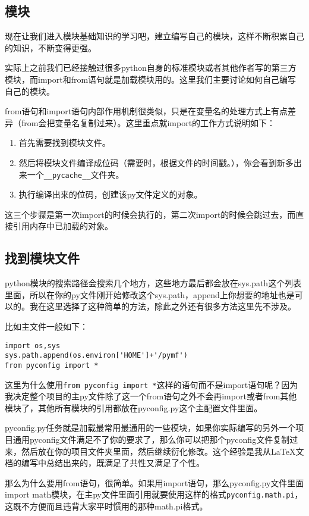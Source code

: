 \documentclass[12pt,oneside]{book}
\begin{document}
\begin{common-format}
\chapter{模块}
现在让我们进入模块基础知识的学习吧，建立编写自己的模块，这样不断积累自己的知识，不断变得更强。

实际上之前我们已经接触过很多python自身的标准模块或者其他作者写的第三方模块，而import和from语句就是加载模块用的。这里我们主要讨论如何自己编写自己的模块。

from语句和import语句内部作用机制很类似，只是在变量名的处理方式上有点差异（from会把变量名复制过来）。这里重点就import的工作方式说明如下：
\begin{enumerate}
\item 首先需要找到模块文件。
\item 然后将模块文件编译成位码（需要时，根据文件的时间戳。），你会看到新多出来一个\verb+__pycache__+文件夹。
\item 执行编译出来的位码，创建该py文件定义的对象。
\end{enumerate}
这三个步骤是第一次import的时候会执行的，第二次import的时候会跳过去，而直接引用内存中已加载的对象。



\section{找到模块文件}
python模块的搜索路径会搜索几个地方，这些地方最后都会放在sys.path这个列表里面，所以在你的py文件刚开始修改这个sys.path，append上你想要的地址也是可以的。我在这里选择了这种简单的方法，除此之外还有很多方法这里先不涉及。

比如主文件一般如下：
\begin{Verbatim}
import os,sys
sys.path.append(os.environ['HOME']+'/pymf')
from pyconfig import *
\end{Verbatim}
这里为什么使用\verb+from pyconfig import *+这样的语句而不是import语句呢？因为我决定整个项目的主py文件除了这一个from语句之外不会再import或者from其他模块了，其他所有模块的引用都放在pyconfig.py这个主配置文件里面。

pyconfig.py任务就是加载最常用最通用的一些模块，如果你实际编写的另外一个项目通用pyconfig文件满足不了你的要求了，那么你可以把那个pyconfig文件复制过来，然后放在你的项目文件夹里面，然后继续衍化修改。这个经验是我从\LaTeX 文档的编写中总结出来的，既满足了共性又满足了个性。

那么为什么要用from语句，很简单。如果用import语句，那么pyconfig.py文件里面import math模块，在主py文件里面引用就要使用这样的格式\verb+pyconfig.math.pi+，这既不方便而且违背大家平时惯用的那种math.pi格式。



\end{common-format}
\end{document}
